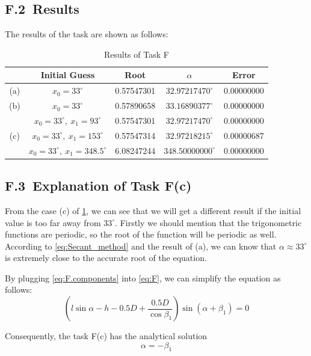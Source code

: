 \documentclass[a4paper]{article}
\begin{document}
\subsection*{F.2\ Results}

The results of the task are shown as follows:
\begin{table}[htbp]
  \centering
  \begin{tabular}{|c|c|c|c|c|}
    \hline
    & \textbf{Initial Guess} & \textbf{Root} & \textbf{$\alpha$} & \textbf{Error} \\
    \hline 
    (a) & $x_0 = 33^{\circ}$ & 0.57547301 & $32.97217470^{\circ}$ & 0.00000000 \\
    \hline 
    (b) & $x_0 = 33^{\circ}$ & 0.57890658 & $33.16890377^{\circ}$ & 0.00000000 \\
    \hline 
    \multirow{3}{*}{(c)} & $x_0 = 33^{\circ} ,\ x_1 = 93^{\circ}$ & 0.57547301 & $32.97217470^{\circ}$ & 0.00000000 \\
    \cline{2-5}
    & $x_0 = 33^{\circ} ,\ x_1 = 153^{\circ}$ & 0.57547314 & $32.97218215^{\circ}$ & 0.00000687 \\
    \cline{2-5}
    & $x_0 = 33^{\circ} ,\ x_1 = 348.5^{\circ}$ & 6.08247244 & $348.50000000^{\circ}$ & 0.00000000 \\
    \hline
  \end{tabular}
  \caption{Results of Task F}
  \label{tab:F}
\end{table}

\subsection*{F.3\ Explanation of Task F(c)}

From the case (c) of \cref{tab:F}, we can see that we will get a different result if the initial value is too far away from $33^{\circ}$. 
Firstly we should mention that the trigonometric functions are periodic, so the root of the function will be periodic as well. 
According to \cref{eq:Secant_method} and the result of (a), we can know that $\alpha \approx 33^{\circ}$ is extremely close to the accurate root of the equation. 

By plugging \cref{eq:F.components} into \cref{eq:F}, we can simplify the equation as follows:
\begin{equation}
    (l\sin \alpha - h - 0.5D + \frac{0.5D}{\cos \beta_1}) \sin (\alpha + \beta_1) = 0
    \label{eq:F.re}
\end{equation}

Consequently, the task F(c) has the analytical solution 
\begin{equation}
  \alpha = -\beta_1
  \label{eq:F.sol}
\end{equation}
\end{document}
